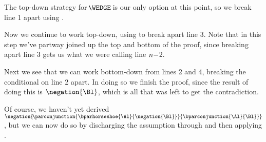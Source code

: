 \noindent{}The top-down strategy for $\!\WEDGE\!$ is our only option at this point, so we break line 1 apart using .
\begin{gproof}
\galineNCnd{}{}{}
\galineNCnd{}{$\qquad\vdots$}{}
\galineNCnd{}{}{}
\end{gproof}
\noindent{}Now we continue to work top-down, using  to break apart line 3. Note that in this step we've partway joined up the top and bottom of the proof, since breaking apart line 3 gets us what we were calling line $n-$2.
\begin{gproof}
\galineNCnd{}{}{}
\galineNCnd{}{$\qquad\vdots$}{}
\galineNCnd{}{}{}
\end{gproof}
\noindent{}Next we see that we can work bottom-down from lines 2 and 4, breaking the conditional on line 2 apart. In doing so we finish the proof, since the result of doing this is $\negation{\Bl}$, which is all that was left to get the contradiction. 
\begin{gproof}[\label{helpful1}]
\end{gproof}
Of course, we haven't yet derived $\negation{\!\parconjunction{\bparhorseshoe{\Al}{\negation{\Bl}}}{\bparconjunction{\Al}{\Bl}}}$, but we can now do so by discharging the assumption through  and then applying .
